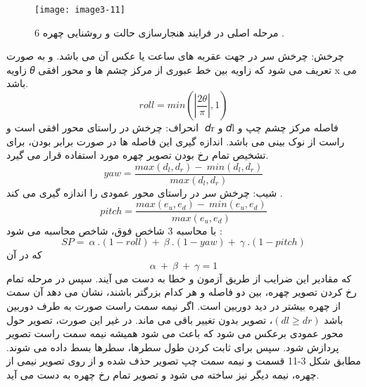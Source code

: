 \begin{figure}[h]
\centering
  \texttt{[image: image3-11]}
  \caption{6 مرحله اصلی در فرایند هنجارسازی حالت و روشنایی چهره \cite{ref1}.}
  \label{image2-1}
\end{figure}
\noindent
چرخش: چرخش سر در جهت عقربه های ساعت یا عکس آن می باشد. و به صورت زاویه 𝜃 تعریف می شود که زاویه بین خط عبوری از مرکز چشم ها و محور افقی x می باشد.
\begin{equation}\label{eq3-4}
roll=min(\left|\frac{2\theta}{\pi}\right|,1)
\end{equation}‏
\noindent	
انحراف: چرخش در راستای محور افقی است و 𝑑r و 𝑑l فاصله مرکز چشم چپ و راست از نوک بینی می باشد. اندازه گیری این فاصله ها در صورت برابر بودن، برای تشخیص تمام رخ بودن تصویر چهره مورد استفاده قرار می گیرد.
\begin{equation}\label{eq3-5}
yaw=\frac{max\left(d_l,d_r\right)-\ min(d_l,d_r)}{max(d_l,d_r)}
\end{equation}‏
\noindent
شیب: چرخش سر در راستای محور عمودی را اندازه گیری می کند.
\begin{equation}\label{eq3-6}
pitch=\frac{max\left(e_u,e_d\right)-\ min(e_u,e_d)}{max(e_u,e_d)}	
\end{equation}‏
\noindent
با محاسبه 3 شاخص فوق، شاخص  محاسبه می شود:
\begin{equation}\label{eq3-7}
SP=\ \alpha\ .(1-roll)+\ \beta\ .(1-yaw)+\ \gamma\ .(1-pitch)	
\end{equation}
\noindent‏
که در آن‏
\begin{equation}\label{eq3-8}
\alpha\ +\ \beta\ +\ \gamma=1	
\end{equation}‏
\noindent
که مقادیر این ضرایب از طریق آزمون و خطا به دست می آیند. سپس در مرحله تمام رخ کردن تصویر چهره، بین دو فاصله  و  هر کدام بزرگتر باشند، نشان می دهد آن سمت از چهره بیشتر در دید دوربین است. اگر نیمه سمت راست صورت به طرف دوربین باشد
$(dl \geq dr)$،
تصویر بدون تغییر باقی می ماند. در غیر این صورت، تصویر حول محور عمودی برعکس می شود که باعث می شود همیشه نیمه سمت راست تصویر پردازش شود. سپس برای ثابت کردن طول سطرها، سطرها بسط داده می شوند. مطابق شکل 3-11 قسمت  و  نیمه سمت چپ تصویر حذف شده و از روی تصویر نیمی از چهره، نیمه دیگر نیز ساخته می شود و تصویر تمام رخ چهره به دست می آید.

